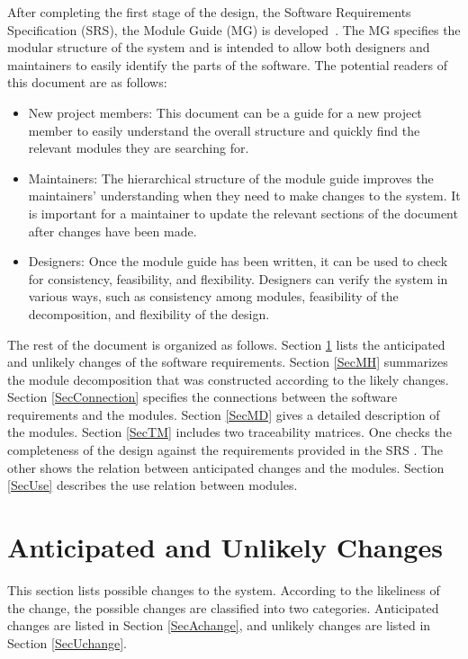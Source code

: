 \documentclass[12pt, titlepage]{article}
\begin{document}
After completing the first stage of the design, the Software Requirements
Specification (SRS), the Module Guide (MG) is developed~\citep{ParnasEtAl1984}. The MG
specifies the modular structure of the system and is intended to allow both
designers and maintainers to easily identify the parts of the software.  The
potential readers of this document are as follows:

\begin{itemize}
\item New project members: This document can be a guide for a new project member
  to easily understand the overall structure and quickly find the
  relevant modules they are searching for.
\item Maintainers: The hierarchical structure of the module guide improves the
  maintainers' understanding when they need to make changes to the system. It is
  important for a maintainer to update the relevant sections of the document
  after changes have been made.
\item Designers: Once the module guide has been written, it can be used to
  check for consistency, feasibility, and flexibility. Designers can verify the
  system in various ways, such as consistency among modules, feasibility of the
  decomposition, and flexibility of the design.
\end{itemize}

The rest of the document is organized as follows. Section
\ref{SecChange} lists the anticipated and unlikely changes of the software
requirements. Section \ref{SecMH} summarizes the module decomposition that
was constructed according to the likely changes. Section \ref{SecConnection}
specifies the connections between the software requirements and the
modules. Section \ref{SecMD} gives a detailed description of the
modules. Section \ref{SecTM} includes two traceability matrices. One checks
the completeness of the design against the requirements provided in the SRS \citep{SRS}.
The other shows the relation between anticipated changes and the modules. Section
\ref{SecUse} describes the use relation between modules.

\section{Anticipated and Unlikely Changes} \label{SecChange}

This section lists possible changes to the system. According to the likeliness
of the change, the possible changes are classified into two
categories. Anticipated changes are listed in Section \ref{SecAchange}, and
unlikely changes are listed in Section \ref{SecUchange}.
\end{document}
